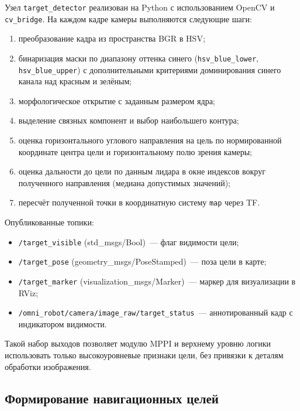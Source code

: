 Узел \texttt{target\_detector} реализован на Python с использованием
OpenCV и \texttt{cv\_bridge}. На каждом кадре камеры выполняются
следующие шаги:
\begin{enumerate}
    \item преобразование кадра из пространства BGR в HSV;
    \item бинаризация маски по диапазону оттенка синего
          (\texttt{hsv\_blue\_lower}, \texttt{hsv\_blue\_upper}) с
          дополнительными критериями доминирования синего канала над
          красным и зелёным;
    \item морфологическое открытие с заданным размером ядра;
    \item выделение связных компонент и выбор наибольшего контура;
    \item оценка горизонтального углового направления на цель по
          нормированной координате центра цели и горизонтальному полю
          зрения камеры;
    \item оценка дальности до цели по данным лидара в окне индексов
          вокруг полученного направления (медиана допустимых значений);
    \item пересчёт полученной точки в координатную систему
          \texttt{map} через TF.
\end{enumerate}

Опубликованные топики:
\begin{itemize}
    \item \texttt{/target\_visible} (std\_msgs/Bool)~--- флаг видимости
          цели;
    \item \texttt{/target\_pose} (geometry\_msgs/PoseStamped)~--- поза
          цели в карте;
    \item \texttt{/target\_marker} (visualization\_msgs/Marker)~--- маркер
          для визуализации в RViz;
    \item \texttt{/omni\_robot/camera/image\_raw/target\_status}~---
          аннотированный кадр с индикатором видимости.
\end{itemize}

Такой набор выходов позволяет модулю MPPI и верхнему уровню логики
использовать только высокоуровневые признаки цели, без привязки к
деталям обработки изображения.

\subsection{Формирование навигационных целей}

